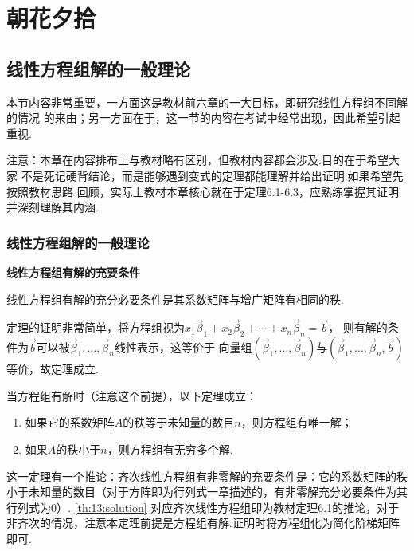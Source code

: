 \chapter{朝花夕拾}

\section{线性方程组解的一般理论}
本节内容非常重要，一方面这是教材前六章的一大目标，即研究线性方程组不同解的情况
的来由；另一方面在于，这一节的内容在考试中经常出现，因此希望引起重视.

注意：本章在内容排布上与教材略有区别，但教材内容都会涉及.目的在于希望大家
不是死记硬背结论，而是能够遇到变式的定理都能理解并给出证明.如果希望先按照教材思路
回顾，实际上教材本章核心就在于定理6.1-6.3，应熟练掌握其证明并深刻理解其内涵.
\subsection{线性方程组解的一般理论}
\begin{theorem} \textbf{\heiti 线性方程组有解的充要条件}

    线性方程组有解的充分必要条件是其系数矩阵与增广矩阵有相同的秩.
\end{theorem}
定理的证明非常简单，将方程组视为$x_1\vec{\beta}_1+x_2\vec{\beta}_2+\cdots+x_n\vec{\beta}_n=\vec{b}$，
则有解的条件为$\vec{b}$可以被$\vec{\beta}_1,\ldots,\vec{\beta}_n$线性表示，这等价于
向量组$(\vec{\beta}_1,\ldots,\vec{\beta}_n)$与$(\vec{\beta}_1,\ldots,\vec{\beta}_n,\vec{b})$等价，故定理成立.

\begin{theorem} \label{th:13:solution}
    当方程组有解时（注意这个前提），以下定理成立：
    \begin{enumerate}
        \item 如果它的系数矩阵$A$的秩等于未知量的数目$n$，则方程组有唯一解；

        \item 如果$A$的秩小于$n$，则方程组有无穷多个解.
    \end{enumerate}
\end{theorem}
这一定理有一个推论：齐次线性方程组有非零解的充要条件是：它的系数矩阵的秩小于未知量的数目（对于方阵即为行列式一章描述的，有非零解充分必要条件为其行列式为0）.
\autoref{th:13:solution} 对应齐次线性方程组即为教材定理6.1的推论，对于非齐次的情况，注意本定理前提是方程组有解.证明时将方程组化为简化阶梯矩阵即可.
